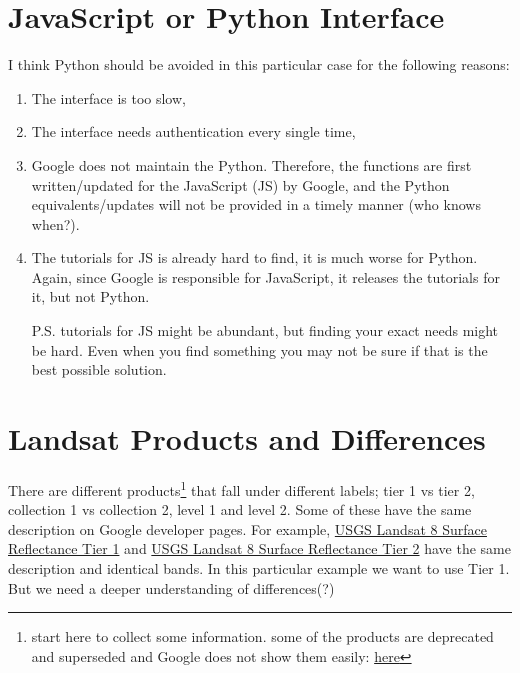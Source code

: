 \documentclass{article}
\begin{document}
\section{JavaScript or Python Interface}
I think Python should be avoided in
this particular case for the following reasons:
\begin{enumerate}
    \item The interface is too slow,
    \item The interface needs authentication every 
          single time,
    \item Google does not maintain the Python. Therefore,
          the functions are first written/updated for
          the JavaScript (JS) by Google,
          and the Python
          equivalents/updates will not be provided 
          in a timely manner (who knows when?).
    \item The tutorials for JS is already 
          hard to find, it is much worse for Python. 
          Again, since Google is responsible for
          JavaScript, it releases the
          tutorials for it, but not Python.
          
          P.S. tutorials for JS might be abundant,
          but finding your exact needs might be hard.
          Even when you find something you may not
          be sure if that is the best possible
          solution.
\end{enumerate}

\section{Landsat Products and Differences}

There are different products\footnote{start here to collect some information. some of the products are deprecated and superseded and Google does not show them easily: \href{https://developers.google.com/earth-engine/datasets/catalog/landsat}{here}} that fall under 
different labels; tier 1 vs tier 2, collection 1 vs collection 2, level 1 and level 2.
Some of these have the same description on 
Google developer pages. For example, 
\href{https://developers.google.com/earth-engine/datasets/catalog/LANDSAT_LC08_C01_T1_SR#description}{USGS Landsat 8 Surface Reflectance Tier 1}
and \href{https://developers.google.com/earth-engine/datasets/catalog/LANDSAT_LC08_C01_T2_SR#description}{USGS Landsat 8 Surface Reflectance Tier 2}
have the same description and identical bands. In this particular example
we want to use Tier 1. But we need a deeper understanding of differences(?)
\end{document}
